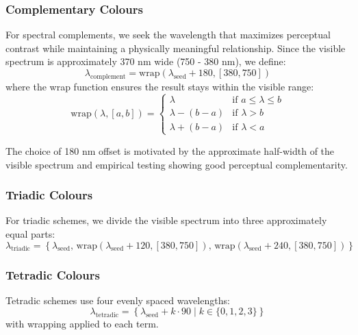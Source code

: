 \documentclass[12pt,a4paper]{article}
\newcommand{\wavelength}{\lambda}
\begin{document}
\subsubsection{Complementary Colours}

For spectral complements, we seek the wavelength that maximizes perceptual contrast while maintaining a physically meaningful relationship. Since the visible spectrum is approximately 370 nm wide (750 - 380 nm), we define:
\begin{equation}
\wavelength_{\text{complement}} = \text{wrap}(\wavelength_{\text{seed}} + 180, [380, 750])
\end{equation}
where the wrap function ensures the result stays within the visible range:
\begin{equation}
\text{wrap}(\wavelength, [a, b]) = \begin{cases}
\wavelength & \text{if } a \leq \wavelength \leq b \\
\wavelength - (b - a) & \text{if } \wavelength > b \\
\wavelength + (b - a) & \text{if } \wavelength < a
\end{cases}
\end{equation}

The choice of 180 nm offset is motivated by the approximate half-width of the visible spectrum and empirical testing showing good perceptual complementarity.

\subsubsection{Triadic Colours}

For triadic schemes, we divide the visible spectrum into three approximately equal parts:
\begin{equation}
\wavelength_{\text{triadic}} = \left\{ \wavelength_{\text{seed}}, \, \text{wrap}(\wavelength_{\text{seed}} + 120, [380, 750]), \, \text{wrap}(\wavelength_{\text{seed}} + 240, [380, 750]) \right\}
\end{equation}

\subsubsection{Tetradic Colours}

Tetradic schemes use four evenly spaced wavelengths:
\begin{equation}
\wavelength_{\text{tetradic}} = \left\{ \wavelength_{\text{seed}} + k \cdot 90 \mid k \in \{0, 1, 2, 3\} \right\}
\end{equation}
with wrapping applied to each term.
\end{document}
